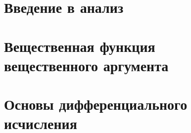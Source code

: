 \documentclass[a4paper,14pt]{report} %
\begin{document}
\newcommand{\pp}{Предположим противное}
\newcommand{\dokvo}{\paragraph{Доказательство.}}
\newcommand{\neobh}{\paragraph{Необходимость.}}
\newcommand{\dost }{\paragraph{Достаточность.}}
\newcommand{\opred}{\paragraph{Определение.}}
\newcommand{\N}{\mathbb{N}}
\newcommand{\Z}{\mathbb{Z}}
\newcommand{\Q}{\mathbb{Q}}
\newcommand{\R}{\mathbb{R}}
\renewcommand{\epsilon}{\varepsilon}
\newcommand{\fXR}{Пусть $X \subset \R, f:X \to \R$ }
\newcommand{\fXRx}{\fXR, $x_0$ - предельная точка $X$ }
\newcommand*{\overcirc}[1]{\accentset{\text{\scalebox{0.5}{$\circ$}}}{#1}}

\tableofcontents %

\LARGE

\chapter{Введение в анализ}

\chapter{Вещественная функция вещественного аргумента}

\chapter{Основы дифференциального исчисления}

\end{document}
